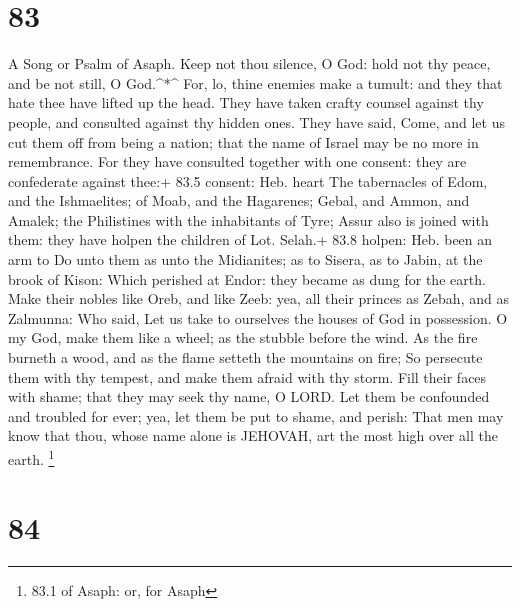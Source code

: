 \hypertarget{section-82}{%
\section{83}\label{section-82}}

A Song or Psalm of Asaph.  Keep not thou silence, O God:
hold not thy peace, and be not still, O God.\^{}*\^{}  For,
lo, thine enemies make a tumult: and they that hate thee have lifted up
the head.  They have taken crafty counsel against thy
people, and consulted against thy hidden ones.  They have
said, Come, and let us cut them off from being a nation; that the name
of Israel may be no more in remembrance.  For they have
consulted together with one consent: they are confederate against thee:+
83.5 consent: Heb. heart  The tabernacles of Edom, and the
Ishmaelites; of Moab, and the Hagarenes;  Gebal, and Ammon,
and Amalek; the Philistines with the inhabitants of Tyre; 
Assur also is joined with them: they have holpen the children of Lot.
Selah.+ 83.8 holpen: Heb. been an arm to  Do unto them as
unto the Midianites; as to Sisera, as to Jabin, at the brook of Kison:
 Which perished at Endor: they became as dung for the
earth.  Make their nobles like Oreb, and like Zeeb: yea,
all their princes as Zebah, and as Zalmunna:  Who said, Let
us take to ourselves the houses of God in possession.  O my
God, make them like a wheel; as the stubble before the wind.
 As the fire burneth a wood, and as the flame setteth the
mountains on fire;  So persecute them with thy tempest, and
make them afraid with thy storm.  Fill their faces with
shame; that they may seek thy name, O LORD.  Let them be
confounded and troubled for ever; yea, let them be put to shame, and
perish:  That men may know that thou, whose name alone is
JEHOVAH, art the most high over all the earth. \footnote{83.1 of Asaph:
  or, for Asaph}

\hypertarget{section-83}{%
\section{84}\label{section-83}}

